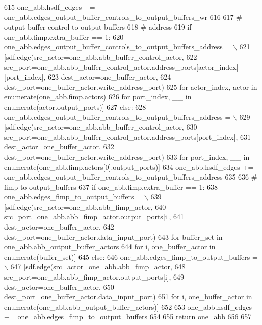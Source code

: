 \begin{DoxyCode}
615         one\_abb.hsdf\_edges += one\_abb.edges\_output\_buffer\_controls\_to\_output\_buffers\_wr
616 
617         \textcolor{comment}{# output buffer control to output buffers}
618         \textcolor{comment}{# address}
619         \textcolor{keywordflow}{if} one\_abb.fimp.extra\_buffer == 1:
620             one\_abb.edges\_output\_buffer\_controls\_to\_output\_buffers\_address = \(\backslash\)
621                 [sdf.edge(src\_actor=one\_abb.abb\_buffer\_control\_actor,
622                           src\_port=one\_abb.abb\_buffer\_control\_actor.address\_ports[actor\_index][port\_index],
623                           dest\_actor=one\_buffer\_actor,
624                           dest\_port=one\_buffer\_actor.write\_address\_port)
625                  \textcolor{keywordflow}{for} actor\_index, actor \textcolor{keywordflow}{in} enumerate(one\_abb.fimp.actors)
626                  \textcolor{keywordflow}{for} port\_index, \_\_ \textcolor{keywordflow}{in} enumerate(actor.output\_ports)]
627         \textcolor{keywordflow}{else}:
628             one\_abb.edges\_output\_buffer\_controls\_to\_output\_buffers\_address = \(\backslash\)
629                 [sdf.edge(src\_actor=one\_abb.abb\_buffer\_control\_actor,
630                           src\_port=one\_abb.abb\_buffer\_control\_actor.address\_ports[port\_index],
631                           dest\_actor=one\_buffer\_actor,
632                           dest\_port=one\_buffer\_actor.write\_address\_port)
633                  \textcolor{keywordflow}{for} port\_index, \_\_ \textcolor{keywordflow}{in} enumerate(one\_abb.fimp.actors[0].output\_ports)]
634         one\_abb.hsdf\_edges += one\_abb.edges\_output\_buffer\_controls\_to\_output\_buffers\_address
635 
636         \textcolor{comment}{# fimp to output\_buffers}
637         \textcolor{keywordflow}{if} one\_abb.fimp.extra\_buffer == 1:
638             one\_abb.edges\_fimp\_to\_output\_buffers = \(\backslash\)
639                 [sdf.edge(src\_actor=one\_abb.abb\_fimp\_actor,
640                           src\_port=one\_abb.abb\_fimp\_actor.output\_ports[i],
641                           dest\_actor=one\_buffer\_actor,
642                           dest\_port=one\_buffer\_actor.data\_input\_port)
643                  \textcolor{keywordflow}{for} buffer\_set \textcolor{keywordflow}{in} one\_abb.abb\_output\_buffer\_actors
644                  \textcolor{keywordflow}{for} i, one\_buffer\_actor \textcolor{keywordflow}{in} enumerate(buffer\_set)]
645         \textcolor{keywordflow}{else}:
646             one\_abb.edges\_fimp\_to\_output\_buffers = \(\backslash\)
647                 [sdf.edge(src\_actor=one\_abb.abb\_fimp\_actor,
648                           src\_port=one\_abb.abb\_fimp\_actor.output\_ports[i],
649                           dest\_actor=one\_buffer\_actor,
650                           dest\_port=one\_buffer\_actor.data\_input\_port)
651                  \textcolor{keywordflow}{for} i, one\_buffer\_actor \textcolor{keywordflow}{in} enumerate(one\_abb.abb\_output\_buffer\_actors)]
652 
653         one\_abb.hsdf\_edges += one\_abb.edges\_fimp\_to\_output\_buffers
654 
655     \textcolor{keywordflow}{return} one\_abb
656 
657 
\end{DoxyCode}
